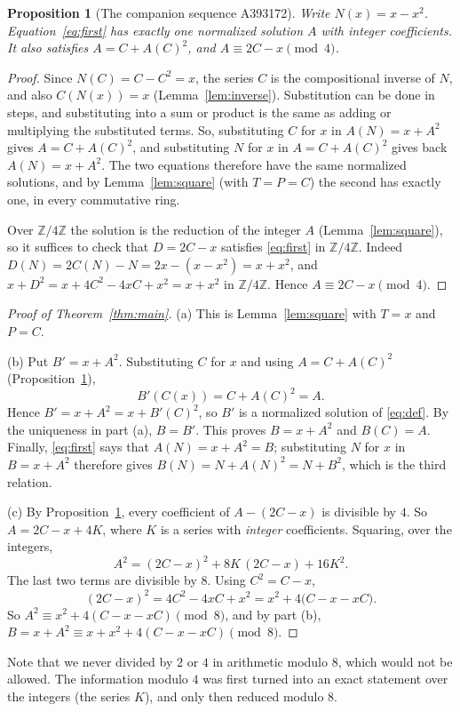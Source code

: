 \documentclass[11pt,a4paper]{article}
\newtheorem{proposition}[theorem]{Proposition}
\theoremstyle{definition}
\theoremstyle{remark}
\newcommand{\Z}{\mathbb{Z}}
\begin{document}
\begin{proposition}[The companion sequence A393172]\label{prop:172}
Write $N(x)=x-x^2$. Equation~\eqref{eq:first} has exactly one normalized solution $A$ with integer coefficients. It also
satisfies $A=C+A(C)^2$, and $A\equiv2C-x\pmod4$.
\end{proposition}

\begin{proof}
Since $N(C)=C-C^2=x$, the series $C$ is the compositional inverse of $N$, and also $C(N(x))=x$
(Lemma~\ref{lem:inverse}). Substitution can be done in steps, and substituting into a sum or product is the same as
adding or multiplying the substituted terms. So, substituting $C$ for $x$ in $A(N)=x+A^2$ gives $A=C+A(C)^2$, and
substituting $N$ for $x$ in $A=C+A(C)^2$ gives back $A(N)=x+A^2$. The two equations therefore have the same normalized
solutions, and by Lemma~\ref{lem:square} (with $T=P=C$) the second has exactly one, in every commutative ring.

Over $\Z/4\Z$ the solution is the reduction of the integer $A$ (Lemma~\ref{lem:square}), so it suffices to check that
$D=2C-x$ satisfies \eqref{eq:first} in $\Z/4\Z$. Indeed $D(N)=2C(N)-N=2x-(x-x^2)=x+x^2$, and
$x+D^2=x+4C^2-4xC+x^2=x+x^2$ in $\Z/4\Z$. Hence $A\equiv2C-x\pmod4$.
\end{proof}

\begin{proof}[Proof of Theorem~\ref{thm:main}]
(a) This is Lemma~\ref{lem:square} with $T=x$ and $P=C$.

(b) Put $B'=x+A^2$. Substituting $C$ for $x$ and using $A=C+A(C)^2$ (Proposition~\ref{prop:172}),
\[
B'(C(x))=C+A(C)^2=A .
\]
Hence $B'=x+A^2=x+B'(C)^2$, so $B'$ is a normalized solution of \eqref{eq:def}. By the uniqueness in part (a), $B=B'$.
This proves $B=x+A^2$ and $B(C)=A$. Finally, \eqref{eq:first} says that $A(N)=x+A^2=B$; substituting $N$ for $x$ in
$B=x+A^2$ therefore gives $B(N)=N+A(N)^2=N+B^2$, which is the third relation.

(c) By Proposition~\ref{prop:172}, every coefficient of $A-(2C-x)$ is divisible by $4$. So $A=2C-x+4K$, where $K$ is a
series with \emph{integer} coefficients. Squaring, over the integers,
\[
A^2=(2C-x)^2+8K\,(2C-x)+16K^2 .
\]
The last two terms are divisible by $8$. Using $C^2=C-x$,
\[
(2C-x)^2=4C^2-4xC+x^2=x^2+4\bigl(C-x-xC\bigr).
\]
So $A^2\equiv x^2+4(C-x-xC)\pmod8$, and by part (b), $B=x+A^2\equiv x+x^2+4(C-x-xC)\pmod8$.
\end{proof}

Note that we never divided by $2$ or $4$ in arithmetic modulo $8$, which would not be allowed. The information modulo $4$
was first turned into an exact statement over the integers (the series $K$), and only then reduced modulo $8$.
\end{document}
